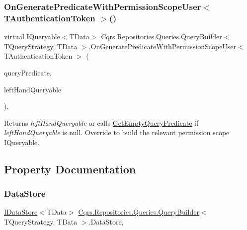 \subsubsection{\texorpdfstring{On\+Generate\+Predicate\+With\+Permission\+Scope\+User$<$ T\+Authentication\+Token $>$()}{OnGeneratePredicateWithPermissionScopeUser< TAuthenticationToken >()}}
{\footnotesize\ttfamily virtual I\+Queryable$<$T\+Data$>$ \hyperlink{classCqrs_1_1Repositories_1_1Queries_1_1QueryBuilder}{Cqrs.\+Repositories.\+Queries.\+Query\+Builder}$<$ T\+Query\+Strategy, T\+Data $>$.On\+Generate\+Predicate\+With\+Permission\+Scope\+User$<$ T\+Authentication\+Token $>$ (\begin{DoxyParamCaption}\item[{\hyperlink{classCqrs_1_1Repositories_1_1Queries_1_1QueryPredicate}{Query\+Predicate}}]{query\+Predicate,  }\item[{I\+Queryable$<$ T\+Data $>$}]{left\+Hand\+Queryable }\end{DoxyParamCaption})\hspace{0.3cm}{\ttfamily [protected]}, {\ttfamily [virtual]}}



Returns {\itshape left\+Hand\+Queryable}  or calls \hyperlink{classCqrs_1_1Repositories_1_1Queries_1_1QueryBuilder_a7dc8f0da3bb4ef54b8cbdda6c50ee0a1_a7dc8f0da3bb4ef54b8cbdda6c50ee0a1}{Get\+Empty\+Query\+Predicate} if {\itshape left\+Hand\+Queryable}  is null. Override to build the relevant permission scope I\+Queryable. 



\subsection{Property Documentation}
\mbox{\label{classCqrs_1_1Repositories_1_1Queries_1_1QueryBuilder_a8a64851b3bf82ed5d2e708cd39d71890_a8a64851b3bf82ed5d2e708cd39d71890}} 
\subsubsection{\texorpdfstring{Data\+Store}{DataStore}}
{\footnotesize\ttfamily \hyperlink{interfaceCqrs_1_1DataStores_1_1IDataStore}{I\+Data\+Store}$<$T\+Data$>$ \hyperlink{classCqrs_1_1Repositories_1_1Queries_1_1QueryBuilder}{Cqrs.\+Repositories.\+Queries.\+Query\+Builder}$<$ T\+Query\+Strategy, T\+Data $>$.Data\+Store\hspace{0.3cm}{\ttfamily [get]}, {\ttfamily [protected]}}



